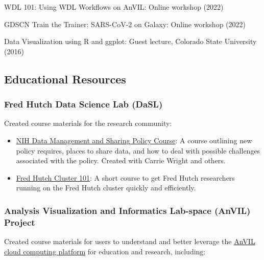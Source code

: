 \documentclass{cv}
\begin{document}
WDL 101: Using WDL Workflows on AnVIL: Online workshop (2022)

GDSCN Train the Trainer: SARS-CoV-2 on Galaxy: Online workshop (2022)

Data Visualization using R and ggplot: Guest lecture, Colorado State University (2016)

\subsection*{Educational Resources}

\subsubsection*{Fred Hutch Data Science Lab (DaSL)}

Created course materials for the research community: 

\begin{itemize}

\item \href{https://hutchdatascience.org/NIH_Data_Sharing/}{NIH Data Management and Sharing Policy Course}: A course outlining new policy requires, places to share data, and how to deal with possible challenges associated with the policy. Created with Carrie Wright and others.

\item \href{https://hutchdatascience.org/FH_Cluster_Guide/}{Fred Hutch Cluster 101}: A short course to get Fred Hutch researchers running on the Fred Hutch cluster quickly and efficiently.

\end{itemize}

\subsubsection*{Analysis Visualization and Informatics Lab-space (AnVIL) Project}

Created course materials for users to understand and better leverage the \href{https://anvilproject.org/}{AnVIL cloud computing platform} for education and research, including: 
\end{document}
